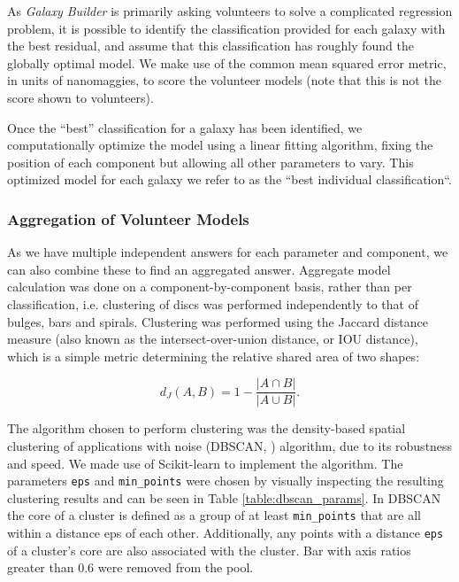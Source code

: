 \documentclass[../main.tex]{subfiles}
\begin{document}
As \textit{Galaxy Builder} is primarily asking volunteers to solve a complicated regression problem, it is possible to identify the classification provided for each galaxy with the best residual, and assume that this classification has roughly found the globally optimal model. We make use of the common mean squared error metric, in units of nanomaggies, to score the volunteer models (note that this is not the score shown to volunteers).

Once the ``best'' classification for a galaxy has been identified, we computationally optimize the model using a linear fitting algorithm, fixing the position of each component but allowing all other parameters to vary. This optimized model for each galaxy we refer to as the ``best individual classification``.

\subsubsection{Aggregation of Volunteer Models}
\label{sec:aggregation_of_volunteer_models}

As we have multiple independent answers for each parameter and component, we can also combine these to find an aggregated answer. Aggregate model calculation was done on a component-by-component basis, rather than per classification, i.e. clustering of discs was performed independently to that of bulges, bars and spirals. Clustering was performed using the Jaccard distance measure (also known as the intersect-over-union distance, or IOU distance), which is a simple metric determining the relative shared area of two shapes:

\begin{equation}
d_J(A, B) = 1 - \frac{|A \cap B|}{|A \cup B|}.
\end{equation}

The algorithm chosen to perform clustering was the density-based spatial clustering of applications with noise (DBSCAN, \citealt{dbscan}) algorithm, due to its robustness and speed. We made use of Scikit-learn \citep{scikit-learn} to implement the algorithm. The parameters \texttt{eps} and \texttt{min\_points} were chosen by visually inspecting the resulting clustering results and can be seen in Table \ref{table:dbscan_params}. In DBSCAN the core of a cluster is defined as a group of at least \texttt{min\_points} that are all within a distance eps of each other. Additionally, any points with a distance \texttt{eps} of a cluster's core are also associated with the cluster. Bar with axis ratios greater than 0.6 were removed from the pool.
\end{document}
